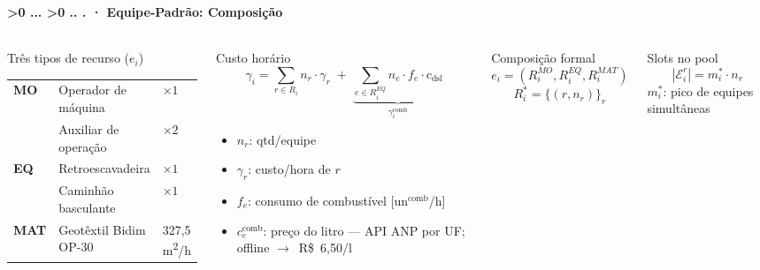 \documentclass[aspectratio=169,10pt]{beamer}
\newcommand{\arr}{$\rightarrow$}
\newcounter{mlc3}[subsection]
\newcounter{mlc4}[mlc3]
\newcommand{\pathnum}{%
  \ifnum\value{mlc4}>0
    \thesection.\thesubsection.\arabic{mlc3}.\arabic{mlc4}%
  \else\ifnum\value{mlc3}>0
    \thesection.\thesubsection.\arabic{mlc3}%
  \else
    \thesection.\thesubsection%
  \fi\fi
}
\newcommand{\lvlA}{\stepcounter{mlc3}}   %
\newcommand{\mtitle}[1]{%
  \frametitle{\insertsection}%
  \framesubtitle{\pathnum\;·\; #1}}
\begin{document}
\lvlA
\begin{frame}
  \mtitle{Equipe-Padrão: Composição}
  \begin{columns}[T]
    \begin{block}{Três tipos de recurso ($e_i$)}
      \scriptsize
      \begin{tabular}{@{}lll@{}}
        \textbf{MO}  & Operador de máquina & $\times 1$ \\
                     & Auxiliar de operação & $\times 2$ \\
        \textbf{EQ}  & Retroescavadeira & $\times 1$ \\
                     & Caminhão basculante & $\times 1$ \\
        \textbf{MAT} & Geotêxtil Bidim OP-30 & 327,5 m\textsuperscript{2}/h \\
      \end{tabular}
    \end{block}
    \vspace{4pt}
    \begin{block}{Custo horário}
      \vspace{-4pt}
      \[
        \gamma_i = \sum_{r \in R_i} n_r \cdot \gamma_r
        \;+\; \underbrace{\sum_{e \in R_i^{EQ}} n_e \cdot f_e \cdot c_{\text{dsl}}}_{\gamma_i^{\text{comb}}}
      \]
      \vspace{-6pt}
      \begin{itemize}\scriptsize\setlength{\itemsep}{0pt}\setlength{\topsep}{0pt}\setlength{\parskip}{0pt}
        \item $n_r$: qtd/equipe
        \item $\gamma_r$: custo/hora de $r$
        \item $f_e$: consumo de combustível [un${}^{\text{comb}}$/h]
        \item $c_{e}^{\text{comb}}$: preço do litro --- API ANP por UF; offline \arr\ R\$~6,50/l
      \end{itemize}
    \end{block}
    \begin{block}{Composição formal}
      \[
        e_i = (R_i^{MO}, R_i^{EQ}, R_i^{MAT})
      \]
      \[
        R_i^{*} = \{(r, n_r)\}_r
      \]
    \end{block}
    \vspace{4pt}
    \begin{block}{Slots no pool}
      \[
        |\mathcal{E}_i^r| = m_i^{*} \cdot n_r
      \]
      $m_i^{*}$: pico de equipes simultâneas
    \end{block}
  \end{columns}
\end{frame}
\end{document}
